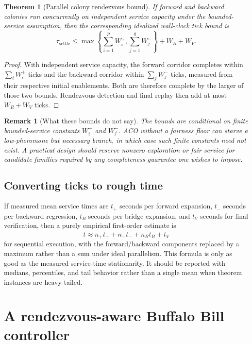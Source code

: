 \documentclass[11pt]{article}
\newtheorem{theorem}[definition]{Theorem}
\newtheorem{remark}[definition]{Remark}
\begin{document}
\begin{theorem}[Parallel colony rendezvous bound]
If forward and backward colonies run concurrently on independent service capacity under the bounded-service assumption, then the corresponding idealized wall-clock tick bound is
\[
\tau_{\mathrm{settle}}
\le
\max\left\{
\sum_{i=1}^{p}W_i^+,
\sum_{j=1}^{q}W_j^-
\right\}
+W_R+W_V.
\]
\end{theorem}

\begin{proof}
With independent service capacity, the forward corridor completes within $\sum_iW_i^+$ ticks and the backward corridor within $\sum_jW_j^-$ ticks, measured from their respective initial enablements. Both are therefore complete by the larger of those two bounds. Rendezvous detection and final replay then add at most $W_R+W_V$ ticks.
\end{proof}

\begin{remark}[What these bounds do not say]
The bounds are conditional on finite bounded-service constants $W_i^+$ and $W_j^-$. ACO without a fairness floor can starve a low-pheromone but necessary branch, in which case such finite constants need not exist. A practical design should reserve nonzero exploration or fair service for candidate families required by any completeness guarantee one wishes to impose.
\end{remark}

\subsection{Converting ticks to rough time}
If measured mean service times are $t_+$ seconds per forward expansion, $t_-$ seconds per backward regression, $t_B$ seconds per bridge expansion, and $t_V$ seconds for final verification, then a purely empirical first-order estimate is
\[
\widehat t
\approx
n_+t_+ + n_-t_- + n_B t_B + t_V
\]
for sequential execution, with the forward/backward components replaced by a maximum rather than a sum under ideal parallelism. This formula is only as good as the measured service-time stationarity. It should be reported with medians, percentiles, and tail behavior rather than a single mean when theorem instances are heavy-tailed.

\section{A rendezvous-aware Buffalo Bill controller}
\end{document}
